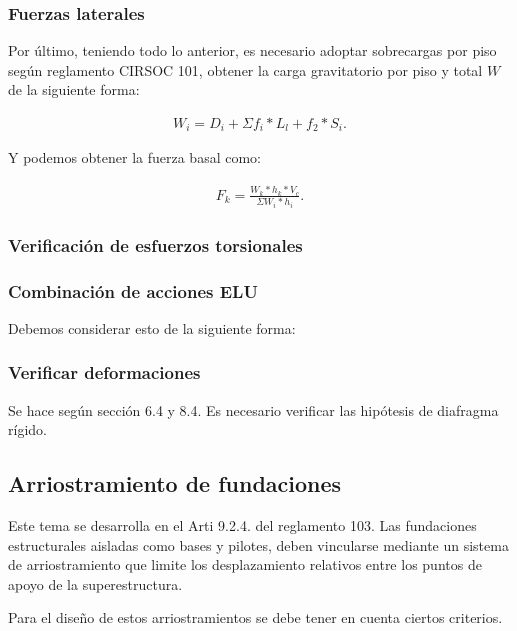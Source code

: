 \documentclass[../main.tex]{subfiles}
\begin{document}
\subsubsection{Fuerzas laterales}

Por último, teniendo todo lo anterior, es necesario adoptar sobrecargas por piso
según reglamento CIRSOC 101, obtener la carga gravitatorio por piso y total $W$ 
de la siguiente forma:

 \begin{align*}
  W_i = D_i + \Sigma f_i * L_l + f_2 * S_i 
.\end{align*}

Y podemos obtener la fuerza basal como:

\begin{align*}
  F_k = \frac{W_k*h_k*V_c}{\Sigma W_i*h_i}
.\end{align*}

\subsubsection{Verificación de esfuerzos torsionales}


\subsubsection{Combinación de acciones ELU}

Debemos considerar esto de la siguiente forma:


\subsubsection{Verificar deformaciones}

Se hace según sección 6.4 y 8.4.
Es necesario verificar las hipótesis de diafragma rígido.


\subsection{Arriostramiento de fundaciones}
Este tema se desarrolla en el Arti 9.2.4. del reglamento 103. Las fundaciones
estructurales aisladas como bases y pilotes, deben vincularse mediante un sistema
de arriostramiento que limite los desplazamiento relativos entre los puntos
de apoyo de la superestructura.

Para el diseño de estos arriostramientos se debe tener en cuenta ciertos criterios.

\end{document}
